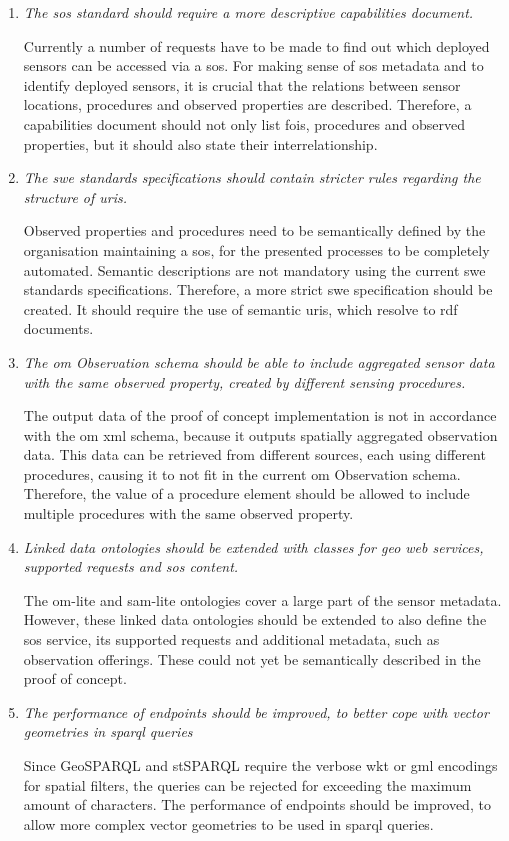 \begin{enumerate}
	\item \textit{The \ac{sos} standard should require a more descriptive capabilities document.}
	
	Currently a number of requests have to be made to find out which deployed sensors can be accessed via a \ac{sos}. For making sense of \ac{sos} metadata and to identify deployed sensors, it is crucial that the relations between sensor locations, procedures and observed properties are described. Therefore, a capabilities document should not only list \acp{foi}, procedures and observed properties, but it should also state their interrelationship.    
	
	
	\item \textit{The \ac{swe} standards specifications should contain stricter rules regarding the structure of \acp{uri}.}
	
	Observed properties and procedures need to be semantically defined by the organisation maintaining a \ac{sos}, for the presented processes to be completely automated. Semantic descriptions are not mandatory using the current \ac{swe} standards specifications. Therefore, a more strict \ac{swe} specification should be created. It should require the use of semantic \acp{uri}, which resolve to \ac{rdf} documents. 
	
	
	\item \textit{The \ac{om} Observation schema should be able to include aggregated sensor data with the same observed property, created by different sensing procedures.}
	
	The output data of the proof of concept implementation is not in accordance with the \ac{om} \ac{xml} schema, because it outputs spatially aggregated observation data. This data can be retrieved from different sources, each using different procedures, causing it to not fit in the current \ac{om} Observation schema. Therefore, the value of a procedure element should be allowed to include multiple procedures with the same observed property.   
	
	
	\item \textit{Linked data ontologies should be extended with classes for geo web services, supported requests and \ac{sos} content.}
	
	The om-lite and sam-lite ontologies cover a large part of the sensor metadata. However, these linked data ontologies should be extended to also define the \ac{sos} service, its supported requests and additional metadata, such as observation offerings. These could not yet be semantically described in the proof of concept.
	
	
	\item \textit{The performance of endpoints should be improved, to better cope with vector geometries in \ac{sparql} queries}
	
	Since GeoSPARQL and stSPARQL require the verbose \ac{wkt} or \acs{gml} encodings for spatial filters, the queries can be rejected for exceeding the maximum amount of characters. The performance of endpoints should be improved, to allow more complex vector geometries to be used in \ac{sparql} queries. 
	
\end{enumerate} 

